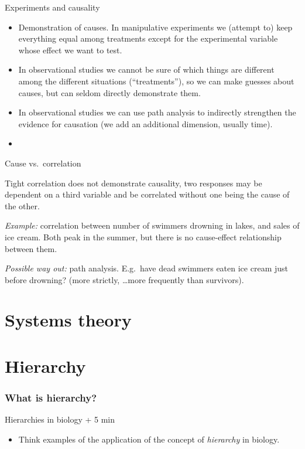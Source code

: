 \documentclass[10pt]{beamer}
\begin{document}
\begin{frame}{Experiments and causality}
\begin{itemize}
\item<1,4> Demonstration of causes. In manipulative experiments we (attempt to) keep
everything equal among treatments except for the experimental
variable whose effect we want to test.

\item<2,4> In observational studies we cannot be sure of which things
are different among the different situations (``treatments''), so we
can make guesses about causes, but can seldom directly demonstrate them.

\item<3,4> In observational studies we can use path analysis to indirectly strengthen the evidence for causation (we add an additional dimension, usually time).

\item<4> \DExamples

\end{itemize}
\end{frame}

\begin{frame}{Cause vs.\ correlation}

Tight correlation does not demonstrate causality, two responses may
be dependent on a third variable and be correlated without one being
the cause of the other. \vspace{5mm} \pause

\emph{Example:} correlation between number of swimmers drowning in
lakes, and sales of ice cream. Both peak in the summer, but there is
no cause-effect relationship between them.

\emph{Possible way out:} path analysis. E.g.\ have dead swimmers eaten
ice cream just before drowning? (more strictly, \ldots more frequently than survivors).

\end{frame}

\section{Systems theory}

\section{Hierarchy}

\begin{frame}
  \frametitle{What is hierarchy? \Discussion}
  \begin{alertblock}{Hierarchies in biology  + 5 min}
    \begin{itemize}
      \item Think examples of the application of the concept of \emph{hierarchy} in biology.
    \end{itemize}
  \end{alertblock}
\end{frame}
\end{document}

